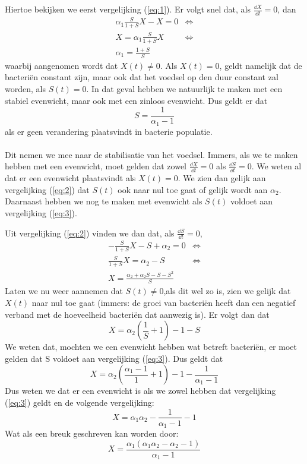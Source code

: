 Hiertoe bekijken we eerst vergelijking (\ref{eq:1}). Er volgt snel dat, als $\tfrac{\dd X}{\dd t} = 0$, dan
\begin{align*}
	\alpha_1 \frac{S}{1 + S} X - X = 0 &\iff \\
	X = \alpha_1 \frac{S}{1 + S}X &\iff \\
	\alpha_1 = \frac{1 + S}{S}
\end{align*}
waarbij aangenomen wordt dat $X(t) \not = 0$. Als $X(t) = 0$, geldt namelijk dat de bacteri\"en constant zijn, maar ook dat het voedsel op den duur constant zal worden, als $S(t) = 0$. In dat geval hebben we natuurlijk te maken met een stabiel evenwicht, maar ook met een zinloos evenwicht. Dus geldt er dat
\begin{equation}
	S = \frac{1}{\alpha_1 - 1}					\label{eq:3}
\end{equation}
als er geen verandering plaatsvindt in bacterie populatie. 
\\
\\
Dit nemen we mee naar de stabilisatie van het voedsel. Immers, als we te maken hebben met een evenwicht, moet gelden dat zowel $\tfrac{\dd X}{\dd t} = 0$ als $\tfrac{\dd S}{ \dd t } = 0$. We weten al dat er een evenwicht plaatsvindt als $X(t) = 0$. We zien dan gelijk aan vergelijking (\ref{eq:2}) dat $S(t)$ ook naar nul toe gaat of gelijk wordt aan $\alpha_2$. Daarnaast hebben we nog te maken met evenwicht als $S(t)$ voldoet aan vergelijking (\ref{eq:3}). 

Uit vergelijking (\ref{eq:2}) vinden we dan dat, als $\tfrac{\dd S}{\dd t} = 0$,
\begin{align*}
	- \frac{S}{1 + S}X - S + \alpha_2 = 0 		&\iff \\
	\frac{S}{1 + S}X = \alpha_2 - S 			&\iff \\
	X = \frac{\alpha_2 + \alpha_2 S - S - S^2}{S}
\end{align*}
Laten we nu weer aannemen dat $S(t) \not = 0$,als dit wel zo is, zien we gelijk dat $X(t)$ naar nul toe gaat (immers: de groei van bacteri\"en heeft dan een negatief verband met de hoeveelheid bacteri\"en dat aanwezig is). Er volgt dan dat
\begin{equation*}
	X = \alpha_2 \left( \frac{1}{S} + 1 \right) - 1 - S		
\end{equation*}
We weten dat, mochten we een evenwicht hebben wat betreft bacteri\"en, er moet gelden dat S voldoet aan vergelijking (\ref{eq:3}). Dus geldt dat
\begin{equation*}
	X = \alpha_2 \left( \frac{\alpha_1 - 1}{1} + 1 \right) - 1 - \frac{1}{\alpha_1 - 1}
\end{equation*}
Dus weten we dat er een evenwicht is als we zowel hebben dat vergelijking (\ref{eq:3}) geldt en de volgende vergelijking:
\begin{equation*}
	X = \alpha_1\alpha_2 - \frac{1}{\alpha_1 - 1} - 1
\end{equation*}
Wat als een breuk geschreven kan worden door:
\begin{equation}
	X = \frac{ \alpha_1(\alpha_1 \alpha_2 - \alpha_2 - 1)}{ \alpha_1 - 1} 		\label{eq:4}
\end{equation}

